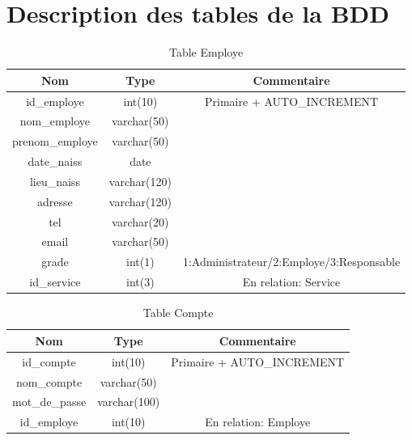 \documentclass{report}
\begin{document}
\chapter{Description des tables de la BDD}
\label{a1}
\begin{table}[h!]
    \begin{center}
        \begin{tabular}{|c|c|c|}
            \hline
            \textbf{Nom} & \textbf{Type} & \textbf{Commentaire}  \\
            \hline
            id\_employe & int(10) & Primaire + AUTO\_INCREMENT \\
            \hline
            nom\_employe & varchar(50) & \\
            \hline
            prenom\_employe & varchar(50) & \\
            \hline
            date\_naiss & date & \\
            \hline
            lieu\_naiss & varchar(120) & \\
            \hline
            adresse & varchar(120) & \\
            \hline
            tel & varchar(20) &\\
            \hline
            email & varchar(50) & \\
            \hline
            grade & int(1) & 1:Administrateur/2:Employe/3:Responsable\\
            \hline
            id\_service & int(3) & En relation: Service \\
            \hline
        \end{tabular}
    \end{center}
\caption{Table Employe}
\end{table}

\begin{table}[h!]
    \begin{center}
        \begin{tabular}{|c|c|c|}
            \hline
            \textbf{Nom} & \textbf{Type} & \textbf{Commentaire}  \\
            \hline
            id\_compte & int(10) & Primaire + AUTO\_INCREMENT \\
            \hline
            nom\_compte & varchar(50) & \\
            \hline
            mot\_de\_passe & varchar(100) & \\
            \hline
            id\_employe & int(10) & En relation: Employe \\
            \hline
        \end{tabular}
    \end{center}
\caption{Table Compte}
\end{table}
\end{document}
